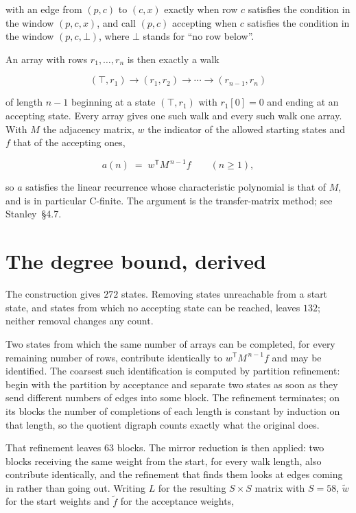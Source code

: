 \documentclass[11pt]{article}
\theoremstyle{definition}
\begin{document}
with an edge from $(p,c)$ to $(c,x)$ exactly when row $c$ satisfies the condition in the window $(p,c,x)$, and call $(p,c)$ accepting when $c$ satisfies the condition in the window $(p,c,\bot)$, where $\bot$ stands for ``no row below''.

An array with rows $r_1,\dots,r_n$ is then exactly a walk

\[(\top,r_1) \to (r_1,r_2) \to \cdots \to (r_{n-1},r_n)\]

of length $n-1$ beginning at a state $(\top,r_1)$ with $r_1[0]=0$ and ending at an accepting state. Every array gives one such walk and every such walk one array. With $M$ the adjacency matrix, $w$ the indicator of the allowed starting states and $f$ that of the accepting ones,

\[a(n) \;=\; w^{\mathsf T} M^{\,n-1} f \qquad (n \ge 1),\]

so $a$ satisfies the linear recurrence whose characteristic polynomial is that of $M$, and is in particular C-finite. The argument is the transfer-matrix method; see Stanley~\S4.7.

\section{The degree bound, derived}

The construction gives $272$ states. Removing states unreachable from a start state, and states from which no accepting state can be reached, leaves $132$; neither removal changes any count.

Two states from which the same number of arrays can be completed, for every remaining number of rows, contribute identically to $w^{\mathsf T}M^{\,n-1}f$ and may be identified. The coarsest such identification is computed by partition refinement: begin with the partition by acceptance and separate two states as soon as they send different numbers of edges into some block. The refinement terminates; on its blocks the number of completions of each length is constant by induction on that length, so the quotient digraph counts exactly what the original does.

That refinement leaves $63$ blocks. The mirror reduction is then applied: two blocks receiving the same weight from the start, for every walk length, also contribute identically, and the refinement that finds them looks at edges coming in rather than going out. Writing $L$ for the resulting $S \times S$ matrix with $S = 58$, $\tilde w$ for the start weights and $\tilde f$ for the acceptance weights,
\end{document}
